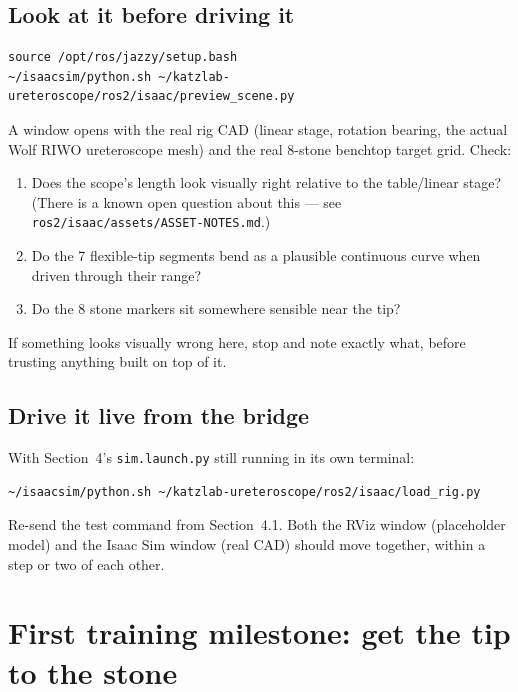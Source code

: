 \documentclass[11pt]{article}
\begin{document}
\subsection{Look at it before driving it}
\begin{lstlisting}
source /opt/ros/jazzy/setup.bash
~/isaacsim/python.sh ~/katzlab-ureteroscope/ros2/isaac/preview_scene.py
\end{lstlisting}

A window opens with the real rig CAD (linear stage, rotation bearing, the
actual Wolf RIWO ureteroscope mesh) and the real 8-stone benchtop target
grid. Check:

\begin{enumerate}
  \item Does the scope's length look visually right relative to the
        table/linear stage? (There is a known open question about this
        --- see \texttt{ros2/isaac/assets/ASSET-NOTES.md}.)
  \item Do the 7 flexible-tip segments bend as a plausible continuous
        curve when driven through their range?
  \item Do the 8 stone markers sit somewhere sensible near the tip?
\end{enumerate}

If something looks visually wrong here, stop and note exactly what, before
trusting anything built on top of it.

\subsection{Drive it live from the bridge}
With Section~4's \texttt{sim.launch.py} still running in its own
terminal:

\begin{lstlisting}
~/isaacsim/python.sh ~/katzlab-ureteroscope/ros2/isaac/load_rig.py
\end{lstlisting}

Re-send the test command from Section~4.1. Both the RViz window
(placeholder model) and the Isaac Sim window (real CAD) should move
together, within a step or two of each other.

\section{First training milestone: get the tip to the stone}
\end{document}
